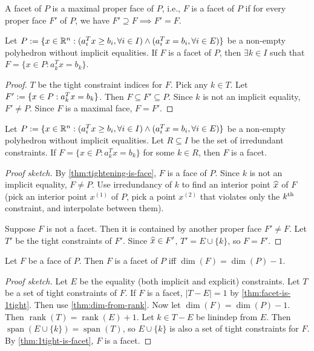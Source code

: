 \documentclass[a4paper, 12pt, fleqn]{article}
\DeclareMathOperator{\rank}{rank}
\DeclareMathOperator{\Span}{span}
\begin{document}
\begin{definition}[Facet]
A facet of $P$ is a maximal proper face of $P$, i.e., $F$ is a facet of $P$ if
for every proper face $F'$ of $P$, we have $F' \supseteq F \implies F' = F$.
\end{definition}

\begin{theorem}
\label{thm:facet-is-1tight}
Let $P := \{x \in \mathbb{R}^n: (a_i^Tx \ge b_i, \forall i \in I) \wedge (a_i^Tx = b_i, \forall i \in E)\}$
be a non-empty polyhedron without implicit equalities.
If $F$ is a facet of $P$, then $\exists k \in I$ such that $F = \{x \in P: a_k^Tx = b_k\}$.
\end{theorem}
\begin{proof}
$T$ be the tight constraint indices for $F$. Pick any $k \in T$.
Let $F' := \{x \in P: a_k^Tx = b_k\}$. Then $F \subseteq F' \subseteq P$.
Since $k$ is not an implicit equality, $F' \neq P$.
Since $F$ is a maximal face, $F = F'$.
\end{proof}

\begin{theorem}
\label{thm:1tight-is-facet}
Let $P := \{x \in \mathbb{R}^n: (a_i^Tx \ge b_i, \forall i \in I) \wedge (a_i^Tx = b_i, \forall i \in E)\}$
be a non-empty polyhedron without implicit equalities.
Let $R \subseteq I$ be the set of irredundant constraints.
If $F = \{x \in P: a_k^Tx = b_k\}$ for some $k \in R$, then $F$ is a facet.
\end{theorem}
\begin{proof}[Proof sketch]
By \cref{thm:tightening-is-face}, $F$ is a face of $P$.
Since $k$ is not an implicit equality, $F \neq P$.
Use irredundancy of $k$ to find an interior point $\widehat{x}$ of $F$
(pick an interior point $x^{(1)}$ of $P$,
pick a point $x^{(2)}$ that violates only the $k^{\textrm{th}}$ constraint,
and interpolate between them).

Suppose $F$ is not a facet. Then it is contained by another proper face $F' \neq F$.
Let $T'$ be the tight constraints of $F'$. Since $\widehat{x} \in F'$, $T' = E \cup \{k\}$, so $F = F'$.
\end{proof}

\begin{theorem}
Let $F$ be a face of $P$. Then $F$ is a facet of $P$ iff $\dim(F) = \dim(P)-1$.
\end{theorem}
\begin{proof}[Proof sketch]
Let $E$ be the equality (both implicit and explicit) constraints.
Let $T$ be a set of tight constraints of $F$.
If $F$ is a facet, $|T-E| = 1$ by \cref{thm:facet-is-1tight}. Then use \cref{thm:dim-from-rank}.
Now let $\dim(F) = \dim(P)-1$. Then $\rank(T) = \rank(E)+1$.
Let $k \in T-E$ be linindep from $E$. Then $\Span(E\cup\{k\}) = \Span(T)$,
so $E \cup \{k\}$ is also a set of tight constraints for $F$.
By \cref{thm:1tight-is-facet}, $F$ is a facet.
\end{proof}
\end{document}
